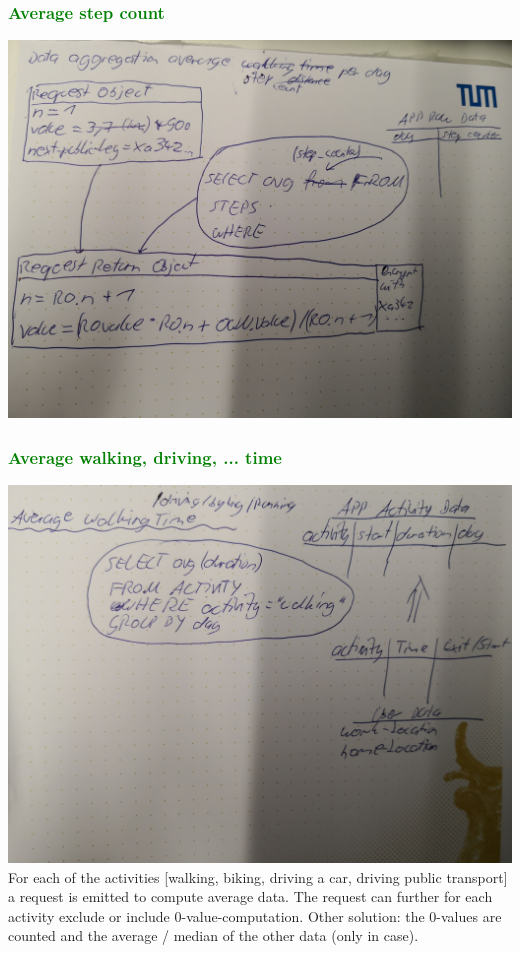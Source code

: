 \subsubsection{\textcolor{green}{Average step count}}
\includegraphics[width=\textwidth]{data/data-aggregation-average-step.jpg}

\subsubsection{\textcolor{green}{Average walking, driving, ... time}}
\includegraphics[width=\textwidth]{data/data-aggregation-average-walking.jpg}
For each of the activities [walking, biking, driving a car, driving public transport] a request is emitted to compute average data.
The request can further for each activity exclude or include 0-value-computation. Other solution: the 0-values are counted and the average / median of the other data (only in case).

